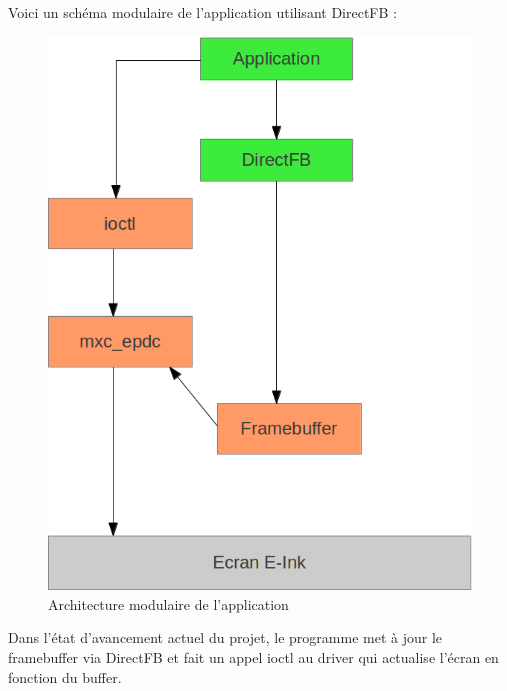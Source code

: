 Voici un schéma modulaire de l'application utilisant DirectFB : 

\begin{figure}[h!]
	\begin{center}	
		\includegraphics[scale=0.5]{schema_direct_fb.png}
		\caption{Architecture modulaire de l'application}
	\end{center}
\end{figure}

Dans l'état d'avancement actuel du projet, le programme met à jour le framebuffer via DirectFB et fait un appel ioctl au driver qui actualise l'écran en fonction du buffer. 



%
